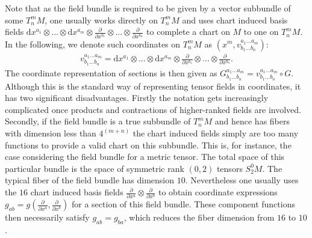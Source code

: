 Note that as the field bundle is required to be given by a vector subbundle of some $T^m_n M$, one usually works directly on $T^m_n M$ and uses chart induced basis fields $\mathrm{d}x^{a_1}\otimes ... \otimes \mathrm{d}x^{a_m} \otimes \frac{\partial}{\partial x^{b_1}} \otimes ... \otimes \frac{\partial}{\partial x^{b_n}}$ to complete a chart on $M$ to one on $T ^m _ n M$. In the following, we denote such coordinates on $T^m_n M$ as $(x^m, v^{a_1 ... a_m}_{b_1 ... b_n})$:
\begin{align}
    v^{a_1 ... a_m}_{b_1 ... b_n} = \mathrm{d}x^{a_1}\otimes ... \otimes \mathrm{d}x^{a_m} \otimes \frac{\partial}{\partial x^{b_1}} \otimes ... \otimes \frac{\partial}{\partial x^{b_n}}.
\end{align}
The coordinate representation of sections is then given as $G^{a_1 ... a_m}_{b_1 ... b_n} = v^{a_1 ... a_m}_{b_1 ... b_n} \circ G $. Although this is the standard way of representing tensor fields in coordinates, it has two significant disadvantages. Firstly the notation gets increasingly complicated once products and contractions of higher-ranked fields are involved. Secondly, if the field bundle is a true subbundle of $T^m_nM$ and hence has fibers with dimension less than $4^{(m+n)}$ the chart induced fields simply are too many functions to provide a valid chart on this subbundle. 
This is, for instance, the case considering the field bundle for a metric tensor. The total space of this particular bundle is the space of symmetric rank $(0,2)$ tensors $S^0_2M$. The typical fiber of the field bundle has dimension $10$. Nevertheless one usually uses the $16$ chart induced basis fields $ \frac{\partial}{\partial x^a}  \otimes \frac{\partial}{\partial x^b}$ to obtain coordinate expressions $g_{ab} = g(\frac{\partial}{\partial x^a},\frac{\partial}{\partial x^b})$ for a section of this field bundle. These component functions then necessarily satisfy $g_{ab} = g_{ba}$, which reduces the fiber dimension from $16$ to $10$. 

